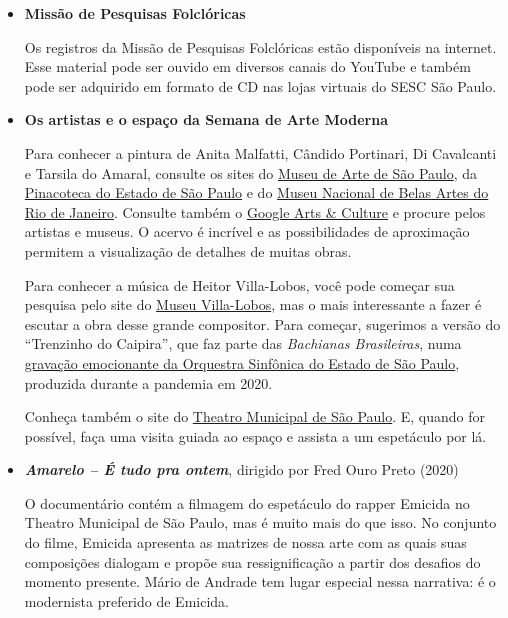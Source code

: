 \documentclass[11pt]{extarticle}
\begin{document}
\begin{itemize}
\item \textbf{Missão de Pesquisas Folclóricas}

Os registros da Missão de Pesquisas Folclóricas estão disponíveis na
internet. Esse material pode ser ouvido em diversos canais do YouTube e
também pode ser adquirido em formato de CD nas lojas virtuais do SESC
São Paulo.


\item \textbf{Os artistas e o espaço da Semana de Arte Moderna}

Para conhecer a pintura de Anita Malfatti, Cândido Portinari, Di
Cavalcanti e Tarsila do Amaral, consulte os sites do \href{https://masp.org.br/}{Museu de Arte de
São Paulo}, da \href{http://pinacoteca.org.br/}{Pinacoteca do Estado de São
Paulo} e do \href{https://mnba.gov.br/}{Museu Nacional de Belas Artes do Rio de Janeiro}. 
Consulte também o \href{https://artsandculture.google.com/}{Google Arts \& Culture} e
procure pelos artistas e museus. O acervo é incrível e as possibilidades
de aproximação permitem a visualização de detalhes de muitas obras.

Para conhecer a música de Heitor Villa-Lobos, você pode começar sua
pesquisa pelo site do \href{https://museuvillalobos.museus.gov.br/}{Museu Villa-Lobos}, 
mas o mais interessante a fazer é escutar a obra desse grande compositor. Para começar,
sugerimos a versão do ``Trenzinho do Caipira'', que faz parte das
\emph{Bachianas Brasileiras}, numa \href{https://youtu.be/KTKVgaY56NI}{gravação emocionante da Orquestra
Sinfônica do Estado de São Paulo}, produzida durante a pandemia em 2020.

Conheça também o site do \href{https://theatromunicipal.org.br/}
{Theatro Municipal de São Paulo}. E, quando for possível, faça uma visita 
guiada ao espaço e assista a um espetáculo por lá.

\item \textbf{\emph{Amarelo -- É tudo pra ontem}}, dirigido por Fred Ouro Preto (2020)

O documentário contém a filmagem do espetáculo do rapper Emicida no
Theatro Municipal de São Paulo, mas é muito mais do que isso. No
conjunto do filme, Emicida apresenta as matrizes de nossa arte com as
quais suas composições dialogam e propõe sua ressignificação a partir
dos desafios do momento presente. Mário de Andrade tem lugar especial
nessa narrativa: é o modernista preferido de Emicida.
\end{itemize}
\end{document}
